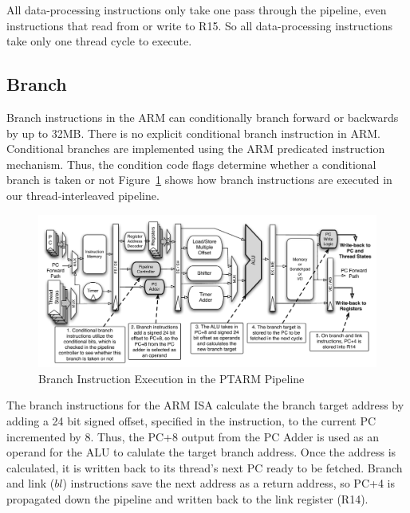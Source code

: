 All data-processing instructions only take one pass through the pipeline, even instructions that read from or write to R15.
So all data-processing instructions take only one thread cycle to execute. 

\subsection{Branch}
Branch instructions in the ARM can conditionally branch forward or backwards by up to 32MB.
There is no explicit conditional branch instruction in ARM.
Conditional branches are implemented using the ARM predicated instruction mechanism.
Thus, the condition code flags determine whether a conditional branch is taken or not 
Figure~\ref{fig:branch_pipeline_implementation} shows how branch instructions are executed in our thread-interleaved pipeline.

\begin{figure}[h]
  
  \begin{center}
    \includegraphics[scale=.54]{figs/branch_pipeline_implementation}
  \end{center}
  \vspace{-3mm}
  \caption{Branch Instruction Execution in the PTARM Pipeline}
  \label{fig:branch_pipeline_implementation}
\end{figure}

The branch instructions for the ARM ISA calculate the branch target address by adding a 24 bit signed offset, specified in the instruction, to the current PC incremented by 8. 
Thus, the PC+8 output from the PC Adder is used as an operand for the ALU to calulate the target branch address.  
Once the address is calculated, it is written back to its thread's next PC ready to be fetched.
Branch and link ($bl$) instructions save the next address as a return address, so PC+4 is propagated down the pipeline and written back to the link register (R14).  

